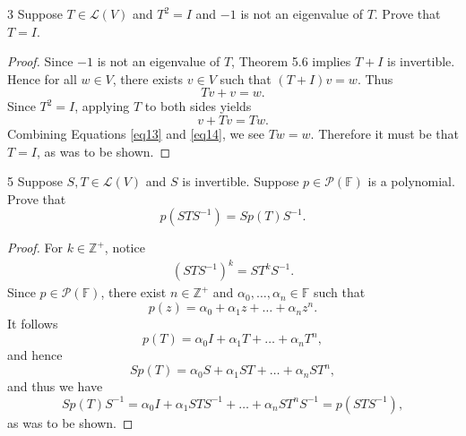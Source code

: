 \documentclass{extarticle}
\newenvironment{problem}[1]{\begin{prob*}{#1}{}}{\end{prob*}}
\newcommand{\Z}{\mathbb{Z}}
\newcommand{\F}{\mathbb{F}}
\newcommand{\poly}{\mathcal{P}}
\newcommand{\Hom}{\mathcal{L}}
\begin{document}
\begin{problem}{3}
Suppose $T\in\Hom(V)$ and $T^2 = I$ and $-1$ is not an eigenvalue of $T$.  Prove that $T = I$.  
\end{problem}
\begin{proof}
Since $-1$ is not an eigenvalue of $T$, Theorem 5.6 implies $T + I$ is invertible.  Hence for all $w\in V$, there exists $v\in V$ such that $(T+I)v = w$.  Thus 
\begin{equation}
Tv + v = w. \label{eq13}
\end{equation}
Since $T^2 = I$, applying $T$ to both sides yields
\begin{equation}
v + Tv = Tw. \label{eq14}
\end{equation}  
Combining Equations \ref{eq13} and \ref{eq14}, we see $Tw = w$.  Therefore it must be that $T= I$, as was to be shown.
\end{proof}

\begin{problem}{5}
Suppose $S,T\in\Hom(V)$ and $S$ is invertible.  Suppose $p\in\poly(\F)$ is a polynomial.  Prove that 
\begin{equation*}
p\left(STS^{-1}\right) = Sp(T)S^{-1}.
\end{equation*}
\end{problem}
\begin{proof}
For $k\in\Z^+$, notice
\begin{align*}
\left(STS^{-1}\right)^k = ST^kS^{-1}.
\end{align*}
Since $p\in\poly(\F)$, there exist $n\in\Z^+$ and $\alpha_0,\dots,\alpha_n\in\F$ such that 
\begin{equation*}
p(z) = \alpha_0 + \alpha_1z + \dots + \alpha_n z^n. 
\end{equation*}
It follows
\begin{equation*}
p(T) = \alpha_0 I  + \alpha_1T + \dots + \alpha_nT^n,
\end{equation*}
and hence
\begin{equation*}
Sp(T) = \alpha_0 S + \alpha_1ST + \dots + \alpha_n ST^n,
\end{equation*}
and thus we have
\begin{equation*}
Sp(T)S^{-1} = \alpha_0 I + \alpha_1 STS^{-1} + \dots + \alpha_n ST^nS^{-1} = p\left(STS^{-1}\right),
\end{equation*}
as was to be shown.
\end{proof}
\end{document}
